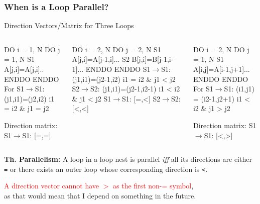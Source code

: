 \documentclass{beamer}
\newcommand{\red}[1]{\textcolor{Red}{{#1}}}
\newcommand{\emp}[1]{\textcolor{DikuRed}{ #1}}
\newcommand{\mymath}[1]{$ #1 $}
\begin{document}
\begin{frame}[fragile,t]
  \frametitle{When is a Loop Parallel?} %

\begin{block}{Direction Vectors/Matrix for Three Loops }
\begin{columns}
\begin{colorcode}
  DO i = 1, N
    DO j = 1, N
S1    A[j,i]=A[j,i]..
    ENDDO
  ENDDO\pause
For S1\mymath{\rightarrow}S1: 
    (j1,i1)=(j2,i2) 
    i1 \emp{=} i2 \& j1 \emp{=} j2

Direction matrix:
S1\mymath{\rightarrow}S1: \emp{[=,=]}
\end{colorcode}
\begin{colorcode}
  DO i = 2, N
    DO j = 2, N
S1    A[j,i]=A[j-1,i]...
S2    B[j,i]=B[j-1,i-1]...
    ENDDO
  ENDDO\pause
S1\mymath{\rightarrow}S1: (j1,i1)=(j2-1,i2)
        i1 \emp{=} i2 \& j1 \emp{<} j2
S2\mymath{\rightarrow}S2: (j1,i1)=(j2-1,i2-1)
        i1 \emp{<} i2 \& j1 \emp{<} j2
S1\mymath{\rightarrow}S1: \emp{[=,<]}
S2\mymath{\rightarrow}S2: \emp{[<,<]}
\end{colorcode}
\begin{colorcode}
  DO i = 2, N
    DO j = 1, N
S1    A[i,j]=A[i-1,j+1]...
    ENDDO
  ENDDO
For S1\mymath{\rightarrow}S1:\pause
    (i1,j1) = (i2-1,j2+1)
    i1 \emp{<} i2 \& j1 \emp{>} j2

Direction matrix:
S1\mymath{\rightarrow}S1: \emp{[<,>]}
\end{colorcode}
\end{columns}
\end{block} 

{\bf Th. Parallelism:} A loop in a loop nest is parallel {\em iff} all its directions
are either {\tt =} or there exists an outer loop whose corresponding direction is {\tt <}. 

\smallskip

\red{A direction vector cannot have $>$ as the first non-= symbol},\\
as that would mean that I depend on something in the future. 
\end{frame}
\end{document}
